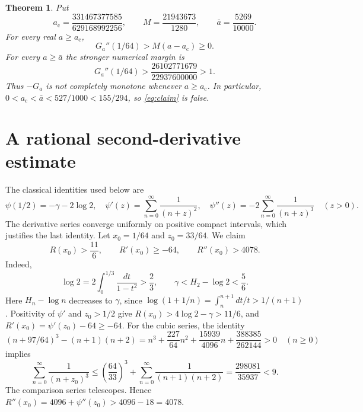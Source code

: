 \documentclass[11pt]{article}
\newtheorem{theorem}{Theorem}
\newcommand{\ac}{a_{\mathrm c}}
\newcommand{\ab}{\bar a}
\begin{document}
\begin{theorem}\label{thm:main}
Put
\[
\ac=\frac{331467377585}{629168992256},\qquad
M=\frac{21943673}{1280},\qquad \ab=\frac{5269}{10000}.
\]
For every real $a\geq\ac$,
\begin{equation}
G_a''(1/64)>M(a-\ac)\geq0.\label{eq:main}
\end{equation}
For every $a\geq\ab$ the stronger numerical margin is
\begin{equation}
G_a''(1/64)>\frac{26102771679}{22937600000}>1.
\label{eq:simple}
\end{equation}
Thus $-G_a$ is not completely monotone whenever $a\geq\ac$.
In particular,
$0<\ac<\ab<527/1000<155/294$, so \eqref{eq:claim} is false.
\end{theorem}

\section{A rational second-derivative estimate}
The classical identities used below are~\cite[\S\S5.4(ii), 5.15]{dlmf}
\begin{equation}
\psi(1/2)=-\gamma-2\log2,\quad
\psi'(z)=\sum_{n=0}^{\infty}\frac1{(n+z)^2},\quad
\psi''(z)=-2\sum_{n=0}^{\infty}\frac1{(n+z)^3}\quad(z>0).
\label{eq:psi}
\end{equation}
The derivative series converge uniformly on positive compact intervals,
which justifies the last identity. Let $x_0=1/64$ and $z_0=33/64$.
We claim
\begin{equation}
R(x_0)>\frac{11}{6},\qquad R'(x_0)\geq-64,\qquad
R''(x_0)>4078.\label{eq:three}
\end{equation}
Indeed,
\[
\log2=2\int_0^{1/3}\frac{dt}{1-t^2}>\frac23,
\qquad \gamma<H_2-\log2<\frac56.
\]
Here $H_n-\log n$ decreases to $\gamma$, since
$\log(1+1/n)=\int_n^{n+1}dt/t>1/(n+1)$.
Positivity of $\psi'$ and $z_0>1/2$ give
$R(x_0)>4\log2-\gamma>11/6$, and
$R'(x_0)=\psi'(z_0)-64\geq-64$.
For the cubic series, the identity
\[
(n+97/64)^3-(n+1)(n+2)
=n^3+\frac{227}{64}n^2+\frac{15939}{4096}n
 +\frac{388385}{262144}>0\quad(n\geq0)
\]
implies
\[
\sum_{n=0}^{\infty}\frac1{(n+z_0)^3}
\leq\left(\frac{64}{33}\right)^3+
\sum_{n=0}^{\infty}\frac1{(n+1)(n+2)}
=\frac{298081}{35937}<9.
\]
The comparison series telescopes. Hence
$R''(x_0)=4096+\psi''(z_0)>4096-18=4078$.
\end{document}
